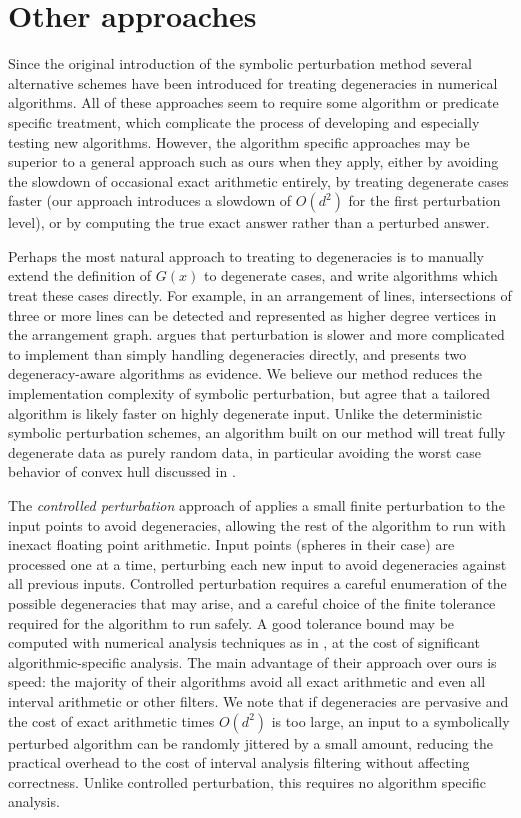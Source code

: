 \documentclass[11pt]{article}
\begin{document}
\section{Other approaches}

Since the original introduction of the symbolic perturbation method several alternative schemes have been introduced for treating degeneracies in numerical algorithms.
All of these approaches seem to require some algorithm or predicate specific treatment, which complicate the process of developing and especially testing new algorithms.
However, the algorithm specific approaches may be superior to a general approach such as ours when they apply, either by avoiding the slowdown of occasional exact arithmetic
entirely, by treating degenerate cases faster (our approach introduces a slowdown of $O(d^2)$ for the first perturbation level), or by computing the true exact answer rather
than a perturbed answer.

Perhaps the most natural approach to treating to degeneracies is to manually extend the definition of $G(x)$ to degenerate cases, and write algorithms which treat these cases
directly.  For example, in an arrangement of lines, intersections of three or more lines can be detected and represented as higher degree vertices in the arrangement graph.
\cite{burnikel1994degeneracy} argues that perturbation is slower and more complicated to implement than simply handling degeneracies directly, and presents two degeneracy-aware
algorithms as evidence.  We believe our method reduces the implementation complexity of symbolic perturbation, but agree that a tailored algorithm is likely faster on highly
degenerate input.  Unlike the deterministic symbolic perturbation schemes, an algorithm built on our method will treat fully degenerate data as purely random data, in particular
avoiding the worst case behavior of convex hull discussed in \cite{burnikel1994degeneracy}.

The \emph{controlled perturbation} approach of \cite{halperin1998perturbation} applies a small finite perturbation to the input points to avoid degeneracies, allowing the rest
of the algorithm to run with inexact floating point arithmetic.  Input points (spheres in their case) are processed one at a time, perturbing each new input to avoid degeneracies
against all previous inputs.  Controlled perturbation requires a careful enumeration of the possible degeneracies that may arise, and a careful choice of the finite tolerance
required for the algorithm to run safely.  A good tolerance bound may be computed with numerical analysis techniques as in \cite{halperin2004controlled}, at the cost of significant
algorithmic-specific analysis.  The main advantage of their approach over ours is speed: the majority of their algorithms avoid all exact arithmetic and even all interval arithmetic
or other filters.  We note that if degeneracies are pervasive and the cost of exact arithmetic times $O(d^2)$ is too large, an input to a symbolically perturbed algorithm can be randomly
jittered by a small amount, reducing the practical overhead to the cost of interval analysis filtering without affecting correctness.  Unlike controlled perturbation, this requires
no algorithm specific analysis.
\end{document}
